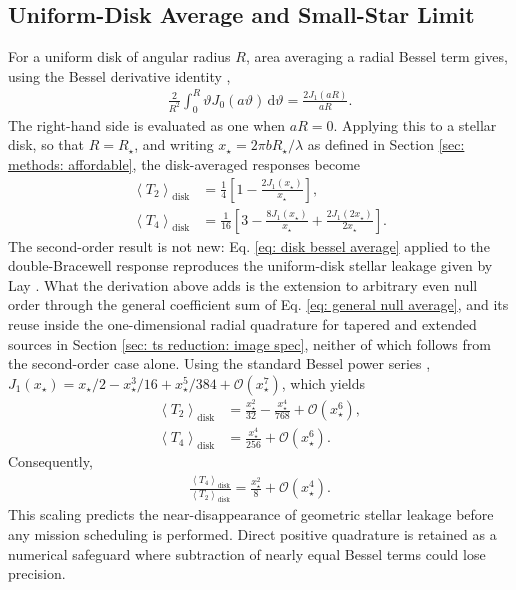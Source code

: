 \documentclass[12pt,a4paper]{article}
\numberwithin{equation}{section}
\numberwithin{figure}{section}
\numberwithin{table}{section}
\begin{document}
\subsection{Uniform-Disk Average and Small-Star Limit}
For a uniform disk of angular radius $R$, area averaging a radial Bessel term gives, using the Bessel derivative identity \cite{nistdlmf},
\begin{align}
\frac{2}{R^2}\int_0^R
\vartheta J_0(a\vartheta)\,\mathrm{d}\vartheta
=\frac{2J_1(aR)}{aR}.
\label{eq: disk bessel average}
\end{align}
The right-hand side is evaluated as one when $aR=0$. Applying this to a stellar disk, so that $R=R_\star$, and writing $x_\star=2\pi bR_\star/\lambda$ as defined in Section \ref{sec: methods: affordable}, the disk-averaged responses become
\begin{align}
\left\langle T_2\right\rangle_\mathrm{disk}
&=\frac14\left[1-\frac{2J_1(x_\star)}{x_\star}\right],\\
\left\langle T_4\right\rangle_\mathrm{disk}
&=\frac1{16}\left[
3-\frac{8J_1(x_\star)}{x_\star}+\frac{2J_1(2x_\star)}{2x_\star}
\right].
\end{align}
The second-order result is not new: Eq. \ref{eq: disk bessel average} applied to the double-Bracewell response reproduces the uniform-disk stellar leakage given by Lay \cite{lay2005imaging}. What the derivation above adds is the extension to arbitrary even null order through the general coefficient sum of Eq. \ref{eq: general null average}, and its reuse inside the one-dimensional radial quadrature for tapered and extended sources in Section \ref{sec: ts reduction: image spec}, neither of which follows from the second-order case alone.
Using the standard Bessel power series \cite{nistdlmf}, $J_1(x_\star)=x_\star/2-x_\star^3/16+x_\star^5/384+\mathcal{O}(x_\star^7)$, which yields
\begin{align}
\left\langle T_2\right\rangle_\mathrm{disk}
&=\frac{x_\star^2}{32}-\frac{x_\star^4}{768}+\mathcal{O}(x_\star^6),\\
\left\langle T_4\right\rangle_\mathrm{disk}
&=\frac{x_\star^4}{256}+\mathcal{O}(x_\star^6).
\end{align}
Consequently,
\begin{align}
\frac{\left\langle T_4\right\rangle_\mathrm{disk}}
{\left\langle T_2\right\rangle_\mathrm{disk}}
=\frac{x_\star^2}{8}+\mathcal{O}(x_\star^4).
\end{align}
This scaling predicts the near-disappearance of geometric stellar leakage before any mission scheduling is performed. Direct positive quadrature is retained as a numerical safeguard where subtraction of nearly equal Bessel terms could lose precision.
\end{document}
